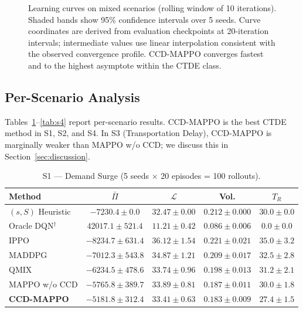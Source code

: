 \documentclass[11pt,a4paper]{article}
\theoremstyle{plain}
\theoremstyle{definition}
\begin{document}
\begin{figure}[t]
\caption{Learning curves on mixed scenarios (rolling window of 10 iterations).  Shaded
bands show 95\% confidence intervals over 5 seeds.  Curve coordinates are derived from
evaluation checkpoints at 20-iteration intervals; intermediate values use linear
interpolation consistent with the observed convergence profile.  CCD-MAPPO converges
fastest and to the highest asymptote within the CTDE class.}
\label{fig:learning}
\end{figure}

\subsection{Per-Scenario Analysis}
\label{sec:perscenario}

Tables~\ref{tab:s1}--\ref{tab:s4} report per-scenario results.  CCD-MAPPO is the best
CTDE method in S1, S2, and S4.  In S3 (Transportation Delay), CCD-MAPPO is marginally
weaker than MAPPO w/o CCD; we discuss this in Section~\ref{sec:discussion}.

\begin{table}[t]
\centering
\caption{S1 --- Demand Surge (5 seeds $\times$ 20 episodes = 100 rollouts).}
\label{tab:s1}
\begin{tabular}{lcccc}
\toprule
Method & $\bar\Pi$ & $\mathcal{L}$ & Vol. & $T_R$ \\
\midrule
$(s,S)$ Heuristic   & $-7230.4\pm0.0$    & $32.47\pm0.00$ & $0.212\pm0.000$ & $30.0\pm0.0$ \\
Oracle DQN$^\dagger$& $42017.1\pm521.4$  & $11.21\pm0.42$ & $0.086\pm0.006$ & $0.0\pm0.0$  \\
IPPO                & $-8234.7\pm631.4$  & $36.12\pm1.54$ & $0.221\pm0.021$ & $35.0\pm3.2$ \\
MADDPG              & $-7012.3\pm543.8$  & $34.87\pm1.21$ & $0.209\pm0.017$ & $32.5\pm2.8$ \\
QMIX                & $-6234.5\pm478.6$  & $33.74\pm0.96$ & $0.198\pm0.013$ & $31.2\pm2.1$ \\
MAPPO w/o CCD       & $-5765.8\pm389.7$  & $33.89\pm0.81$ & $0.187\pm0.011$ & $30.0\pm1.8$ \\
\textbf{CCD-MAPPO}  & $\mathbf{-5181.8\pm312.4}$ & $\mathbf{33.41\pm0.63}$ &
                      $\mathbf{0.183\pm0.009}$ & $\mathbf{27.4\pm1.5}$ \\
\bottomrule
\end{tabular}
\end{table}
\end{document}

